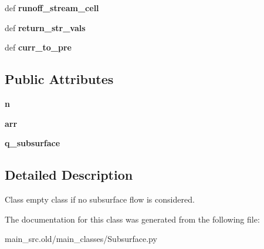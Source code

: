 \begin{DoxyCompactItemize}
\item 
\hypertarget{classmain__src_8old_1_1main__classes_1_1Subsurface_1_1SubsurfacePass_a04c547492f16408b803e1ae8415d9e99}{def {\bfseries runoff\-\_\-stream\-\_\-cell}}\label{classmain__src_8old_1_1main__classes_1_1Subsurface_1_1SubsurfacePass_a04c547492f16408b803e1ae8415d9e99}

\item 
\hypertarget{classmain__src_8old_1_1main__classes_1_1Subsurface_1_1SubsurfacePass_ac8f793c1629f727be06b177f5e1d571a}{def {\bfseries return\-\_\-str\-\_\-vals}}\label{classmain__src_8old_1_1main__classes_1_1Subsurface_1_1SubsurfacePass_ac8f793c1629f727be06b177f5e1d571a}

\item 
\hypertarget{classmain__src_8old_1_1main__classes_1_1Subsurface_1_1SubsurfacePass_a65e6dcb77af489d016112e325ba70867}{def {\bfseries curr\-\_\-to\-\_\-pre}}\label{classmain__src_8old_1_1main__classes_1_1Subsurface_1_1SubsurfacePass_a65e6dcb77af489d016112e325ba70867}

\end{DoxyCompactItemize}
\subsection*{Public Attributes}
\begin{DoxyCompactItemize}
\item 
\hypertarget{classmain__src_8old_1_1main__classes_1_1Subsurface_1_1SubsurfacePass_ae047fb4d5242a658ff66a5e170963f5f}{{\bfseries n}}\label{classmain__src_8old_1_1main__classes_1_1Subsurface_1_1SubsurfacePass_ae047fb4d5242a658ff66a5e170963f5f}

\item 
\hypertarget{classmain__src_8old_1_1main__classes_1_1Subsurface_1_1SubsurfacePass_acecdb58076fcd67d800c63f3ac595cbe}{{\bfseries arr}}\label{classmain__src_8old_1_1main__classes_1_1Subsurface_1_1SubsurfacePass_acecdb58076fcd67d800c63f3ac595cbe}

\item 
\hypertarget{classmain__src_8old_1_1main__classes_1_1Subsurface_1_1SubsurfacePass_ab5205968388652671a0eaf6d63b2ff07}{{\bfseries q\-\_\-subsurface}}\label{classmain__src_8old_1_1main__classes_1_1Subsurface_1_1SubsurfacePass_ab5205968388652671a0eaf6d63b2ff07}

\end{DoxyCompactItemize}


\subsection{Detailed Description}
Class empty class if no subsurface flow is considered. 

The documentation for this class was generated from the following file\-:\begin{DoxyCompactItemize}
\item 
main\-\_\-src.\-old/main\-\_\-classes/Subsurface.\-py\end{DoxyCompactItemize}
